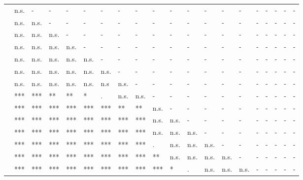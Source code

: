 \documentclass[11pt,fleqn]{article}
\newcommand{\6}{\mbox{$[\hspace*{-.6mm}[$}}
\newcommand{\9}{\mbox{$]\hspace*{-.6mm}]$}}
\begin{document}
\begin{landscape}
\begin{table}[h!]
\begin{tabular}{l l l l l l l l l l l l l l l l l l l l }
\midrule
\color{blue}{\em be right}\color{black}		& n.s. & - & - & - & - & - & - & - & - & - & - & - & - & - & - & - & - & - & - \\
\color{brown}{\em suggest}\color{black}			& n.s. & n.s. & - & - & - & - & - & - & - & - & - & - & - & - & - & - & - & - & - \\
\color{brown}{\em say}	\color{black}		& n.s. & n.s. & n.s. & - & - & - & - & - & - & - & - & - & - & - & - & - & - & - & - \\
\color{black}{\em prove}\color{black}		& n.s. & n.s. & n.s. & n.s. & - & - & - & - & - & - & - & - & - & - & - & - & - & - & - \\
\color{brown}{\em think}\color{black}		& n.s. & n.s. & n.s. & n.s. & n.s. & - & - & - & - & - & - & - & - & - & - & - & - & - & - \\
\color{black}{\em confirm}\color{black}		& n.s. & n.s. & n.s. & n.s. & n.s. & n.s. & - & - & - & - & - & - & - & - & - & - & - & - & - \\
\color{blue}{\em establish}\color{black}		& n.s. & n.s. & n.s. & n.s. & n.s. & n.s & n.s. & - & - & - & - & - & - & - & - & - & - & - & - \\
\color{black}{\em demonstrate}\color{black}		& *** & *** & ** & ** & * & . & n.s. & n.s. & - & - & - & - & - & - & - & - & - & - & - \\
\color{black}{\em announce}\color{black}		& *** & *** & *** & *** & *** & *** & ** & ** & n.s. & - & - & - & - & - & - & - & - & - & - \\
\color{black}{\em confess}\color{black}	& *** & *** & *** & *** & *** & *** & *** & *** & n.s. & n.s. & - & - & - & - & - & - & - & - & - \\
\color{blue}{\em reveal}\color{black}			& *** & *** & *** & *** & *** & *** & *** & *** & n.s. & n.s. & n.s. & - & - & - & - & - & - & - & - \\
\color{black}{\em admit}\color{black}		& *** & *** & *** & *** & *** & *** & *** & *** & . & n.s. & n.s. &  n.s. & - & - & - & - & - & - & - \\
\color{black}{\em acknowledge}\color{black}	& *** & *** & *** & *** & *** & *** & *** & *** & ** & n.s. & n.s. & n.s. & n.s. & - & - & - & - & - & - \\
\color{blue}{\em discover}\color{black}		& *** & *** & *** & *** & *** & *** & *** & *** & *** & * & . & n.s. & n.s. & n.s. & - & - & - & - & - \\

\end{tabular}
\end{table}
\end{landscape}
\end{document}
